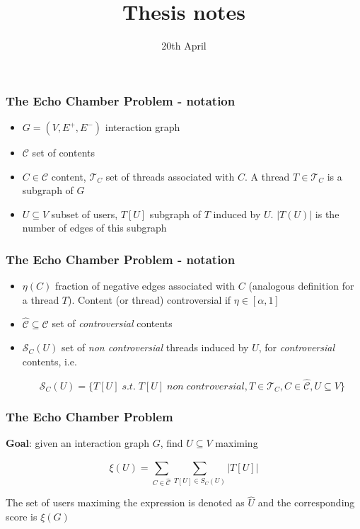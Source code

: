 \documentclass{beamer}
\title{Thesis notes}
\date{20th April}
\begin{document}
\frame{\titlepage}

\begin{frame}[c]
	\frametitle{The Echo Chamber Problem - notation}

	\begin{itemize}
		\item $G = (V, E ^{+}, E ^{-}) $ interaction graph
		\item $ \mathcal{C} $ set of contents
		\item $C \in \mathcal{C} $ content, $\mathcal{T} _{C} $ set of threads
		      associated with $C$. A thread $T \in \mathcal{T} _{C} $ is a
		      subgraph of $G$
		\item $U \subseteq V$ subset of users, $T[U]$ subgraph of $T$ induced
		      by $U$. $|T(U)|$ is the number of edges of this subgraph
	\end{itemize}
\end{frame}

\begin{frame}[c]
	\frametitle{The Echo Chamber Problem - notation}
	\begin{itemize}
		\item $\eta(C)$ fraction of negative edges associated with $C$
		      (analogous definition for a thread $T$). Content (or thread)
		      controversial if $\eta \in [\alpha, 1]$
		\item $\hat{\mathcal{C} } \subseteq \mathcal{C} $ set of \textit{controversial}
		      contents

		\item $\mathcal{S} _C (U)$ set of \textit{non controversial} threads
		      induced by $U$, for \textit{controversial} contents, i.e.

			      {\small
				      \begin{equation}
					      \mathcal{S} _{C} (U) = \{ T[U] \; s.t. \; T[U] \; non \;
					      controversial, T \in \mathcal{T} _{C}, C
					      \in \hat{\mathcal{C}}, U \subseteq V\}
				      \end{equation}
			      }
	\end{itemize}

\end{frame}

\begin{frame}[c]
	\frametitle{The Echo Chamber Problem}
	\textbf{Goal}: given an interaction graph $G$, find $U \subseteq V$ maximing

	\begin{equation}
		\xi (U) = \sum^{}_{C \in \hat{\mathcal{C}} } \sum^{}_{T[U] \in S_C (U)}
		| T[U] |
	\end{equation}

	The set of users maximing the expression is denoted as $\hat{U}$ and the
	corresponding score is $\xi(G)$
\end{frame}
\end{document}
